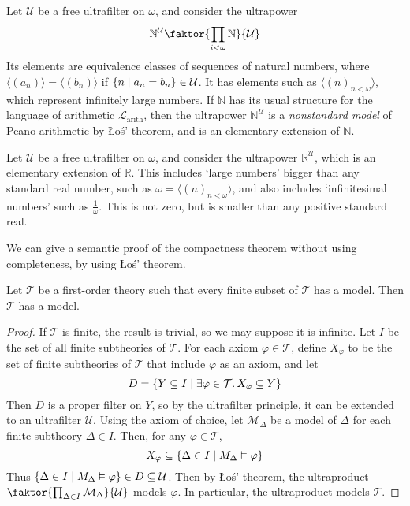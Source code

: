 \begin{example}
    Let \( \mathcal U \) be a free ultrafilter on \( \omega \), and consider the ultrapower
    \[ \mathbb N^{\mathcal U} \faktor{\prod_{i < \omega} \mathbb N}{\mathcal U} \]
    Its elements are equivalence classes of sequences of natural numbers, where \( \langle(a_n)\rangle = \langle(b_n)\rangle \) if \( \qty{n \mid a_n = b_n} \in \mathcal U \).
    It has elements such as \( \langle (n)_{n < \omega} \rangle \), which represent infinitely large numbers.
    If \( \mathbb N \) has its usual structure for the language of arithmetic \( \mathcal L_{\text{arith}} \), then the ultrapower \( \mathbb N^{\mathcal U} \) is a \emph{nonstandard model} of Peano arithmetic by \L{}o\'s' theorem, and is an elementary extension of \( \mathbb N \).
\end{example}
\begin{example}
    Let \( \mathcal U \) be a free ultrafilter on \( \omega \), and consider the ultrapower \( \mathbb R^{\mathcal U} \), which is an elementary extension of \( \mathbb R \).
    This includes `large numbers' bigger than any standard real number, such as \( \omega = \langle (n)_{n < \omega} \rangle \), and also includes `infinitesimal numbers' such as \( \frac{1}{\omega} \).
    This is not zero, but is smaller than any positive standard real.
\end{example}
We can give a semantic proof of the compactness theorem without using completeness, by using \L{}o\'s' theorem.
\begin{corollary}
    Let \( \mathcal T \) be a first-order theory such that every finite subset of \( \mathcal T \) has a model.
    Then \( \mathcal T \) has a model.
\end{corollary}
\begin{proof}
    If \( \mathcal T \) is finite, the result is trivial, so we may suppose it is infinite.
    Let \( I \) be the set of all finite subtheories of \( \mathcal T \).
    For each axiom \( \varphi \in \mathcal T \), define \( X_\varphi \) to be the set of finite subtheories of \( \mathcal T \) that include \( \varphi \) as an axiom, and let
    \[ D = \qty{Y \subseteq I \mid \exists \varphi \in \mathcal T.\, X_\varphi \subseteq Y} \]
    Then \( D \) is a proper filter on \( Y \), so by the ultrafilter principle, it can be extended to an ultrafilter \( \mathcal U \).
    Using the axiom of choice, let \( \mathcal M_\Delta \) be a model of \( \Delta \) for each finite subtheory \( \Delta \in I \).
    Then, for any \( \varphi \in \mathcal T \),
    \[ X_\varphi \subseteq \qty{\Delta \in I \mid M_\Delta \vDash \varphi} \]
    Thus \( \qty{\Delta \in I \mid M_\Delta \vDash \varphi} \in D \subseteq \mathcal U \).
    Then by \L{}o\'s' theorem, the ultraproduct \( \faktor{\prod_{\Delta \in I} \mathcal M_\Delta}{\mathcal U} \) models \( \varphi \).
    In particular, the ultraproduct models \( \mathcal T \).
\end{proof}
